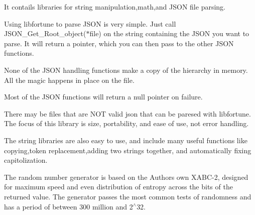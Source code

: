 \-It contails libraries for string manipulation,math,and \-J\-S\-O\-N file parsing.

\-Using libfortune to parse \-J\-S\-O\-N is very simple. \-Just call \-J\-S\-O\-N\-\_\-\-Get\-\_\-\-Root\-\_\-object($\ast$file) on the string containing the \-J\-S\-O\-N you want to parse. \-It will return a pointer, which you can then pass to the other \-J\-S\-O\-N functions.

\-None of the \-J\-S\-O\-N handling functions make a copy of the hierarchy in memory. \-All the magic happens in place on the file.

\-Most of the \-J\-S\-O\-N functions will return a null pointer on failure.

\-There may be files that are \-N\-O\-T valid json that can be paresed with libfortune. \-The focus of this library is size, portability, and ease of use, not error handling.

\-The string libraries are also easy to use, and include many useful functions like copying,token replacement,adding two strings together, and automatically fixing capitolization.

\-The random number generator is based on the \-Authors own \-X\-A\-B\-C-\/2, designed for maximum speed and even distribution of entropy across the bits of the returned value. \-The generator passes the most common tests of randomness and has a period of between 300 million and 2$^\wedge$32. 